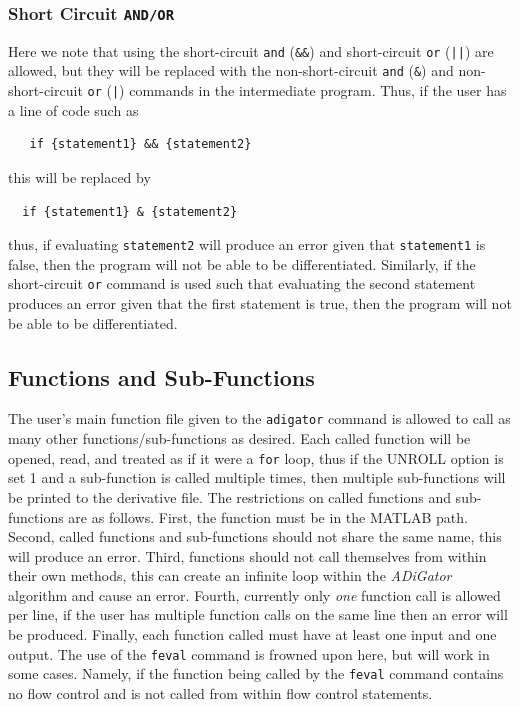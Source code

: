 \documentclass[10pt,pdftex]{article}
\begin{document}
\subsubsection{Short Circuit \texttt{AND/OR}}
Here we note that using the short-circuit \texttt{and} (\texttt{\&\&}) and short-circuit \texttt{or} (\texttt{||}) are allowed, but they will be replaced with the non-short-circuit \texttt{and} (\texttt{\&}) and non-short-circuit \texttt{or} (\texttt{|}) commands in the intermediate program. Thus, if the user has a line of code such as
\begin{verbatim}
   if {statement1} && {statement2}
\end{verbatim}
this will be replaced by
\begin{verbatim}
  if {statement1} & {statement2}
\end{verbatim}
thus, if evaluating \texttt{statement2} will produce an error given that \texttt{statement1} is false, then the program will not be able to be differentiated. Similarly, if the short-circuit \texttt{or} command is used such that evaluating the second statement produces an error given that the first statement is true, then the program will not be able to be differentiated.
\subsection{Functions and Sub-Functions}
The user's main function file given to the \texttt{adigator} command is allowed to call as many other functions/sub-functions as desired.
Each called function will be opened, read, and treated as if it were a \texttt{for} loop, thus if the UNROLL option is set 1 and a sub-function is called multiple times, then multiple sub-functions will be printed to the derivative file.
 The restrictions on called functions and sub-functions are as follows. First, the function must be in the MATLAB path. Second, called functions and sub-functions should not share the same name, this will produce an error. Third, functions should not call themselves from within their own methods, this can create an infinite loop within the \emph{ADiGator} algorithm and cause an error.
Fourth, currently only \emph{one} function call is allowed per line, if the user has multiple function calls on the same line then an error will be produced. 
Finally, each function called must have at least one input and one output. 
The use of the \texttt{feval} command is frowned upon here, but will work in some cases. Namely, if the function being called by the \texttt{feval} command contains no flow control and is not called from within flow control statements.
\end{document}
